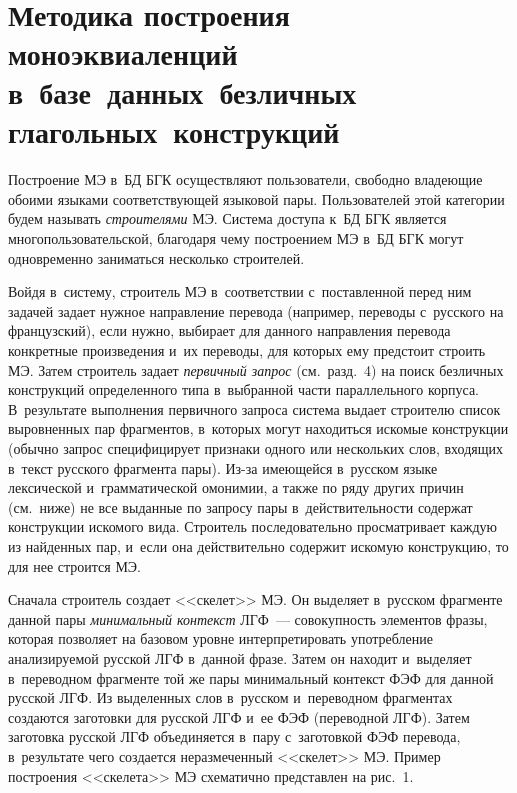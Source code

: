 \begin{multicols}{2}
\begin{figure*} %
\vspace*{1pt}
\begin{center}
\mbox{%
\epsfxsize=133.224mm
}
\end{center}
\vspace*{-9pt}
\vspace*{4pt}
\end{figure*}


\vspace*{-6pt}
  
\section{Методика построения моноэквиаленций в~базе~данных~безличных
глагольных~конструкций}

  Построение МЭ в~БД БГК осуществляют 
пользователи, свободно владеющие обоими языками соответствующей 
языковой пары. Пользователей этой категории будем называть 
\textit{строителями} МЭ. Система доступа к~БД БГК является 
многопользовательской, благодаря чему построением МЭ в~БД БГК могут 
одновременно заниматься несколько строителей. 
  
  Войдя в~систему, строитель МЭ в~соответствии с~поставленной перед ним 
задачей задает нужное направление перевода (например, переводы с~русского 
на французский), если нужно, выбирает для данного направления перевода 
конкретные произведения и~их переводы, для которых ему предстоит строить 
МЭ. Затем строитель задает \textit{первичный запрос} (см.\ разд.~4) на поиск 
безличных конструкций определенного типа в~выбранной части параллельного 
корпуса. В~результате выполнения первичного запроса система выдает 
строителю список выровненных пар фрагментов, в~которых могут находиться 
искомые конструкции (обычно запрос специфицирует признаки одного или 
нескольких слов, входящих в~текст русского фрагмента пары). Из-за 
имеющейся в~русском языке лексической и~грамматической омонимии, а также 
по ряду других причин (см.\ ниже) не все выданные по запросу пары 
в~действительности содержат конструкции искомого вида. Строитель 
последовательно просматривает каждую из найденных пар, и~если она 
действительно содержит искомую конструкцию, то для нее строится МЭ. 
  
  Сначала строитель создает <<скелет>> МЭ. Он выделяет в~русском 
фрагменте данной пары \textit{минимальный контекст} ЛГФ~---  совокупность 
элементов фразы, которая позволяет на базовом уровне интерпретировать 
употребление анализируемой русской ЛГФ в~данной фразе. Затем он находит 
и~выделяет в~переводном фрагменте той же пары минимальный контекст ФЭФ 
для данной русской ЛГФ. Из выделенных слов в~русском и~переводном 
фрагментах создаются заготовки для русской ЛГФ и~ее ФЭФ (переводной 
ЛГФ). Затем заготовка русской ЛГФ объединяется в~пару с~заготовкой ФЭФ 
перевода, в~результате чего создается неразмеченный <<скелет>> МЭ. Пример 
построения <<скелета>> МЭ схематично представлен на рис.~1. 



\end{multicols}
